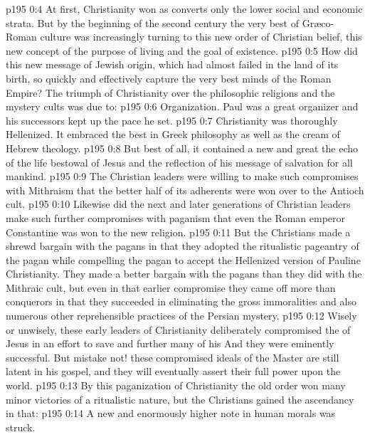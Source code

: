 \vs p195 0:4 \pc At first, Christianity won as converts only the lower social and economic strata. But by the beginning of the second century the very best of Gr\ae co\hyp{}Roman culture was increasingly turning to this new order of Christian belief, this new concept of the purpose of living and the goal of existence.
\vs p195 0:5 How did this new message of Jewish origin, which had almost failed in the land of its birth, so quickly and effectively capture the very best minds of the Roman Empire? The triumph of Christianity over the philosophic religions and the mystery cults was due to:
\vs p195 0:6 \bibnobreakspace Organization. Paul was a great organizer and his successors kept up the pace he set.
\vs p195 0:7 \bibnobreakspace Christianity was thoroughly Hellenized. It embraced the best in Greek philosophy as well as the cream of Hebrew theology.
\vs p195 0:8 \bibnobreakspace But best of all, it contained a new and great  the echo of the life bestowal of Jesus and the reflection of his message of salvation for all mankind.
\vs p195 0:9 \bibnobreakspace The Christian leaders were willing to make such compromises with Mithraism that the better half of its adherents were won over to the Antioch cult.
\vs p195 0:10 \bibnobreakspace Likewise did the next and later generations of Christian leaders make such further compromises with paganism that even the Roman emperor Constantine was won to the new religion.
\vs p195 0:11 \pc But the Christians made a shrewd bargain with the pagans in that they adopted the ritualistic pageantry of the pagan while compelling the pagan to accept the Hellenized version of Pauline Christianity. They made a better bargain with the pagans than they did with the Mithraic cult, but even in that earlier compromise they came off more than conquerors in that they succeeded in eliminating the gross immoralities and also numerous other reprehensible practices of the Persian mystery.
\vs p195 0:12 Wisely or unwisely, these early leaders of Christianity deliberately compromised the  of Jesus in an effort to save and further many of his  And they were eminently successful. But mistake not! these compromised ideals of the Master are still latent in his gospel, and they will eventually assert their full power upon the world.
\vs p195 0:13 By this paganization of Christianity the old order won many minor victories of a ritualistic nature, but the Christians gained the ascendancy in that:
\vs p195 0:14 \bibnobreakspace A new and enormously higher note in human morals was struck.
